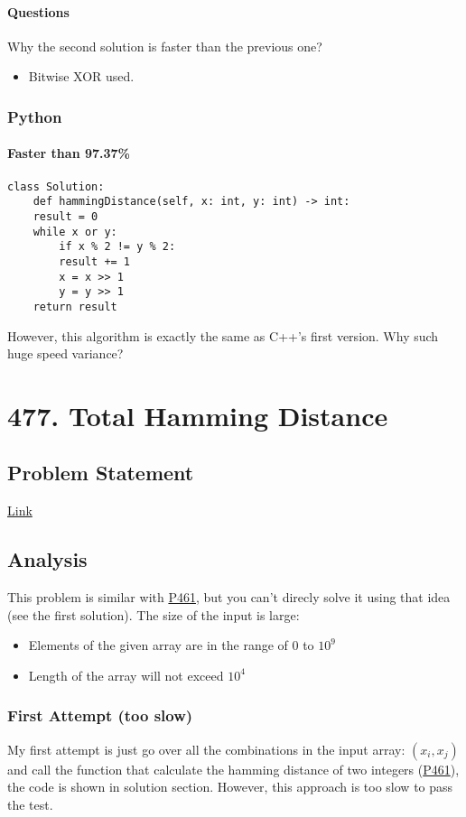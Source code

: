 \documentclass[12pt]{book}
\begin{document}
\subsubsection{Questions}
\label{sec:orgf61ea92}
Why the second solution is faster than the previous one?
\begin{itemize}
\item Bitwise XOR used.
\end{itemize}
\subsection{Python}
\label{sec:org0fb8032}
\subsubsection{Faster than 97.37\%}
\label{sec:orgc617b9c}
\begin{verbatim}
class Solution:
    def hammingDistance(self, x: int, y: int) -> int:
	result = 0
	while x or y:
	    if x % 2 != y % 2:
		result += 1
	    x = x >> 1
	    y = y >> 1
	return result
\end{verbatim}
However, this algorithm is exactly the same as C++'s first version. Why such huge speed variance?
\chapter{477. Total Hamming Distance}
\label{sec:org760ba0c}
\section{Problem Statement}
\label{sec:org4d89a04}
\href{https://leetcode.com/problems/total-hamming-distance/}{Link}
\section{Analysis}
\label{sec:orgf2fa2e6}
This problem is similar with \hyperref[orgba7c19e]{P461}, but you can't direcly solve it using that idea (see the first solution). The size of the input is large:
\begin{itemize}
\item Elements of the given array are in the range of \(0\) to \(10^9\)
\item Length of the array will not exceed \(10^4\)
\end{itemize}

\subsection{First Attempt (too slow)}
\label{sec:org2ca39a8}
My first attempt is just go over all the combinations in the input array: \((x_i, x_j)\) and call the function that calculate the hamming distance of two integers (\hyperref[orgba7c19e]{P461}), the code is shown in solution section. However, this approach is too slow to pass the test.
\end{document}
